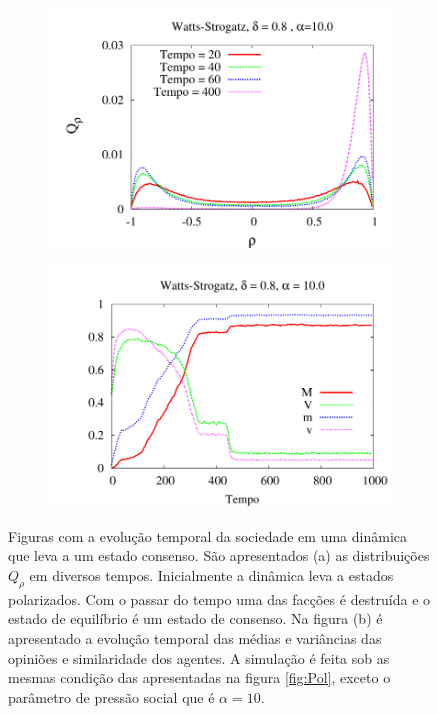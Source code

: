 \begin{figure}
    \centering
    \begin{subfigure}[]{0.75\textwidth}
        \centering
        \includegraphics[width = \textwidth]{Figures/Histograma_Watts_Strogatz_Consenso}
        \caption{}
    \end{subfigure}
    \begin{subfigure}[]{0.75\textwidth}
        \centering
        \includegraphics[width = \textwidth]{Figures/MagTempo_Consenso}
        \caption{}
    \end{subfigure}
    \newline
    \caption{
        Figuras com a evolução temporal da sociedade em uma dinâmica que
        leva a um estado consenso.  São apresentados (a) as distribuições
        $Q_\rho$ em diversos tempos. Inicialmente a dinâmica leva a estados
        polarizados.  Com o passar do tempo uma das facções é destruída
        e o estado de equilíbrio é um estado de consenso. Na figura (b)
        é apresentado a evolução temporal das médias e variâncias das
        opiniões e similaridade dos agentes.  A simulação é feita sob
        as mesmas condição das apresentadas na figura \ref{fig:Pol}, exceto
        o parâmetro de pressão social que é $\alpha=10$.
    } 
    \label{fig:Con}
\end{figure}


